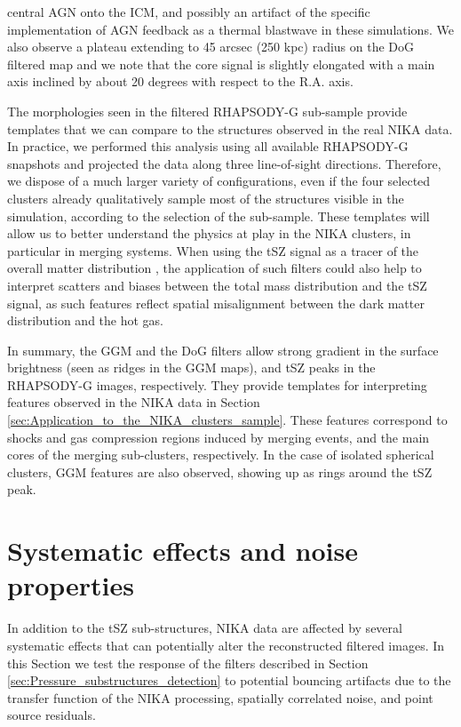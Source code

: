 \documentclass[twocolumn,traditabstract]{aa}
\begin{document}
central AGN onto the ICM, and possibly an artifact of the specific implementation of AGN feedback as a thermal blastwave in these simulations. We also observe a plateau extending to 45 arcsec (250 kpc) radius on the DoG filtered map and we note that the core signal is slightly elongated with a main axis inclined by about 20 degrees with respect to the R.A. axis.

The morphologies seen in the filtered RHAPSODY-G sub-sample provide templates that we can compare to the structures observed in the real NIKA data. In practice, we performed this analysis using all available RHAPSODY-G snapshots and projected the data along three line-of-sight directions. Therefore, we dispose of a much larger variety of configurations, even if the four selected clusters already qualitatively sample most of the structures visible in the simulation, according to the selection of the sub-sample. These templates will allow us to better understand the physics at play in the NIKA clusters, in particular in merging systems. When using the tSZ signal as a tracer of the overall matter distribution \citep[e.g.][]{Adam2015,Adam2016a,Ruppin2016}, the application of such filters could also help to interpret scatters and biases between the total mass distribution and the tSZ signal, as such features reflect spatial misalignment between the dark matter distribution and the hot gas.

In summary, the GGM and the DoG filters allow strong gradient in the surface brightness (seen as ridges in the GGM maps), and tSZ peaks in the RHAPSODY-G images, respectively. They provide templates for interpreting features observed in the NIKA data in Section \ref{sec:Application_to_the_NIKA_clusters_sample}. These features correspond to shocks and gas compression regions induced by merging events, and the main cores of the merging sub-clusters, respectively. In the case of isolated spherical clusters, GGM features are also observed, showing up as rings around the tSZ peak.

\section{Systematic effects and noise properties}\label{sec:Systematics_and_noise_properties}
In addition to the tSZ sub-structures, NIKA data are affected by several systematic effects that can potentially alter the reconstructed filtered images. In this Section we test the response of the filters described in Section \ref{sec:Pressure_substructures_detection} to potential bouncing artifacts due to the transfer function of the NIKA processing, spatially correlated noise, and point source residuals.
\end{document}
